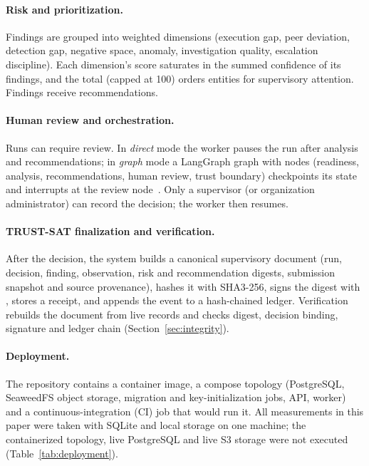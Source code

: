 \paragraph{Risk and prioritization.}
Findings are grouped into  weighted dimensions (execution gap,
peer deviation, detection gap, negative space, anomaly, investigation quality,
escalation discipline). Each dimension's score saturates in the summed
confidence of its findings, and the total (capped at 100) orders entities for
supervisory attention. Findings receive recommendations.

\paragraph{Human review and orchestration.}
Runs can require review. In \emph{direct} mode the worker pauses the run after
analysis and recommendations; in \emph{graph} mode a LangGraph graph with
 nodes (readiness, analysis, recommendations, human review,
trust boundary) checkpoints its state and interrupts at the review node~\cite{langgraph2026docs}.
Only a supervisor (or organization administrator) can record the decision; the worker then
resumes.

\paragraph{TRUST-SAT finalization and verification.}
After the decision, the system builds a canonical supervisory document
(run, decision, finding, observation, risk and recommendation digests, submission
snapshot and source provenance), hashes it with SHA3-256, signs the digest with
, stores a receipt, and appends the event to a hash-chained
ledger. Verification rebuilds the document from live records and checks digest,
decision binding, signature and ledger chain (Section~\ref{sec:integrity}).

\paragraph{Deployment.}
The repository contains a container image, a compose topology (PostgreSQL,
SeaweedFS object storage, migration and key-initialization jobs, API, worker) and a
continuous-integration (CI) job that would run it. All measurements in this paper were taken with SQLite and
local storage on one machine; the containerized topology, live PostgreSQL and live
S3 storage were not executed (Table~\ref{tab:deployment}).

